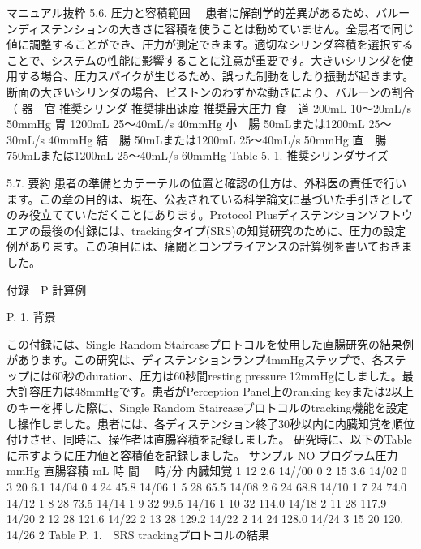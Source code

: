 マニュアル抜粋
5.6. 圧力と容積範囲
　患者に解剖学的差異があるため、バルーンディステンションの大きさに容積を使うことは勧めていません。全患者で同じ値に調整することができ、圧力が測定できます。適切なシリンダ容積を選択することで、システムの性能に影響することに注意が重要です。大きいシリンダを使用する場合、圧力スパイクが生じるため、誤った制動をしたり振動が起きます。断面の大きいシリンダの場合、ピストンのわずかな動きにより、バルーンの割合（%
器　官 	推奨シリンダ 	推奨排出速度 	推奨最大圧力
食　道 	200mL 	10～20mL/s 	50mmHg
胃 	1200mL 	25～40mL/s 	40mmHg
小　腸 	50mLまたは1200mL 	25～30mL/s 	40mmHg
結　腸 	50mLまたは1200mL 	25～40mL/s 	50mmHg
直　腸 	750mLまたは1200mL 	25～40mL/s 	60mmHg
Table 5. 1. 推奨シリンダサイズ

5.7. 要約
患者の準備とカテーテルの位置と確認の仕方は、外科医の責任で行います。この章の目的は、現在、公表されている科学論文に基づいた手引きとしてのみ役立てていただくことにあります。Protocol Plusディステンションソフトウエアの最後の付録には、trackingタイプ(SRS)の知覚研究のために、圧力の設定例があります。この項目には、痛閾とコンプライアンスの計算例を書いておきました。

付録　P
計算例

P. 1. 背景

この付録には、Single Random Staircaseプロトコルを使用した直腸研究の結果例があります。この研究は、ディステンションランプ4mmHgステップで、各ステップには60秒のduration、圧力は60秒間resting pressure 12mmHgにしました。最大許容圧力は48mmHgです。患者がPerception Panel上のranking keyまたは2以上のキーを押した際に、Single Random Staircaseプロトコルのtracking機能を設定し操作しました。患者には、各ディステンション終了30秒以内に内臓知覚を順位付けさせ、同時に、操作者は直腸容積を記録しました。
研究時に、以下のTableに示すように圧力値と容積値を記録しました。
サンプル
NO 	プログラム圧力
mmHg 	直腸容積
mL 	時 間　
時/分 	内臓知覚
1 	12 	2.6 	14//00 	0
2 	15 	3.6 	14/02 	0
3 	20 	6.1 	14/04 	0
4 	24 	45.8 	14/06 	1
5 	28 	65.5 	14/08 	2
6 	24 	68.8 	14/10 	1
7 	24 	74.0 	14/12 	1
8 	28 	73.5 	14/14 	1
9 	32 	99.5 	14/16 	1
10 	32 	114.0 	14/18 	2
11 	28 	117.9 	14/20 	2
12 	28 	121.6 	14/22 	2
13 	28 	129.2 	14/22 	2
14 	24 	128.0 	14/24 	3
15 	20 	120. 	14/26 	2
Table P. 1.　SRS trackingプロトコルの結果


